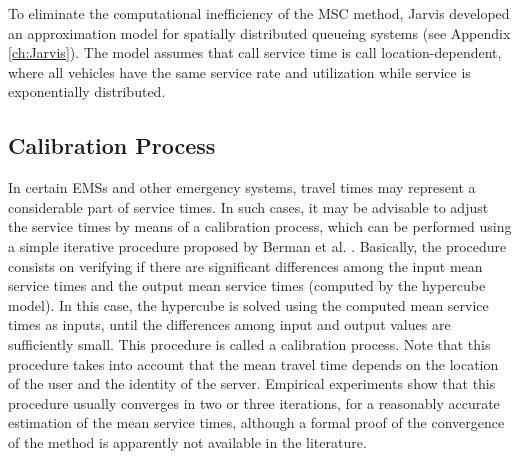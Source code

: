 To eliminate the computational inefficiency of the MSC method,
Jarvis \cite{jarvis1985approximating} developed
an approximation model
for spatially distributed queueing systems
(see Appendix \ref{ch:Jarvis}).
The model assumes that call service time
is call location-dependent,
where all vehicles
have the same service rate and utilization
while service is exponentially distributed.

\subsection{Calibration Process}
In certain EMSs
and other emergency systems,
travel times may represent
a considerable part of service times.
In such cases,
it may be advisable
to adjust the service times
by means of a calibration process,
which can be performed
using a simple iterative procedure
proposed by Berman et al. \cite{berman1987stochastic}.
Basically,
the procedure consists on
verifying
if there are
significant differences among the input mean service times
and the output mean service times (computed by the hypercube model).
In this case,
the hypercube is solved
using the computed mean service times as inputs,
until
the differences
among input and output values
are sufficiently small.
This procedure is called
a calibration process.
Note that
this procedure takes into account
that the mean travel time
depends on the location of the user
and the identity of the server.
Empirical experiments show
that this procedure
usually converges in two or three iterations,
for a reasonably accurate estimation of the mean service times,
although a formal proof of the convergence of the method
is apparently not available in the literature.
